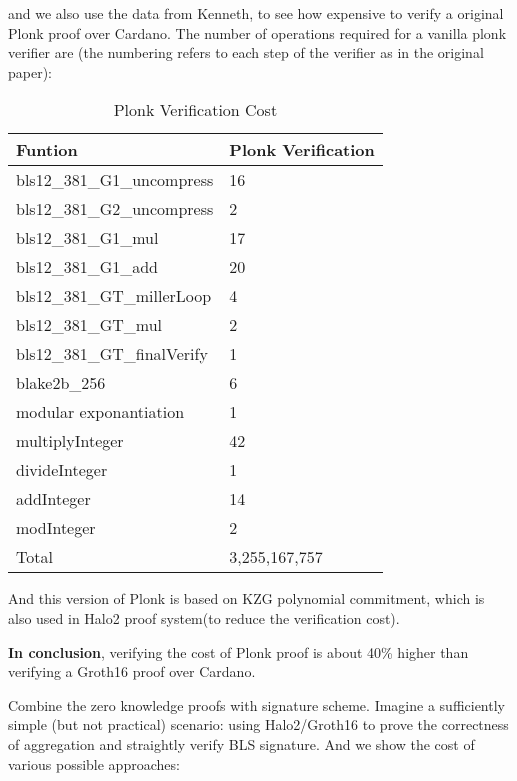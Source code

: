 \documentclass{article}
\begin{document}
and we also use the data from Kenneth, to see how expensive to verify a original Plonk proof over Cardano. The number of operations required for a vanilla plonk verifier are (the numbering refers to each step of the verifier as in the original paper):

\begin{table}[H]
    \centering
    \begin{tabular}{p{5cm}|p{4cm}} \hline
         Funtion & Plonk Verification\\ \hline
         bls12\_381\_G1\_uncompress&  16 \\ \hline
         bls12\_381\_G2\_uncompress&  2  \\ \hline
         bls12\_381\_G1\_mul&  17 \\ \hline
         bls12\_381\_G1\_add&  20  \\ \hline
         bls12\_381\_GT\_millerLoop  & 4  \\ \hline
         bls12\_381\_GT\_mul         & 2  \\ \hline
         bls12\_381\_GT\_finalVerify & 1 \\ \hline
         blake2b\_256 & 6  \\ \hline
         modular exponantiation & 1 \\ \hline
         multiplyInteger &42 \\ \hline
         divideInteger &1 \\ \hline
         addInteger &14 \\ \hline
         modInteger &2 \\ \hline
         Total & 3,255,167,757 \\ \hline
    \end{tabular}
    \caption{Plonk Verification Cost}
    \label{tab:my_label}
\end{table}


And this version of Plonk is based on KZG polynomial commitment, which is also used in Halo2 proof system(to reduce the verification cost).

\textbf{In conclusion}, verifying the cost of Plonk proof is about 40\% higher than verifying a Groth16 proof over Cardano. 

Combine the zero knowledge proofs with signature scheme. 
Imagine a sufficiently simple (but not practical) scenario: using Halo2/Groth16 to prove the correctness of aggregation and straightly verify BLS signature. And we show the cost of various possible approaches:
\end{document}
